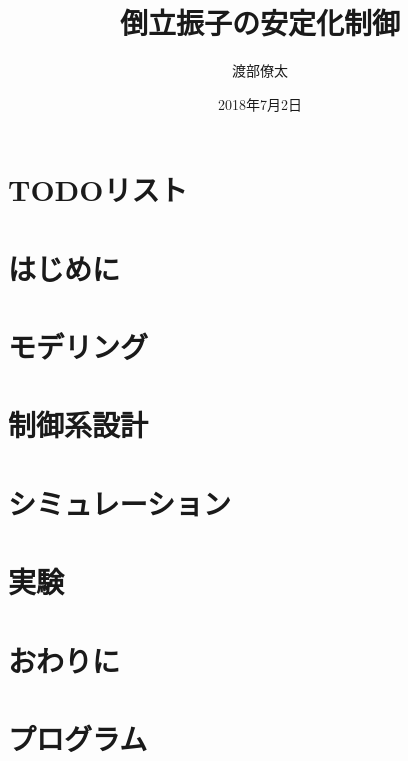 \documentclass[a4j , 11pt , twoside]{jbook}
\begin{document}
\title{倒立振子の安定化制御}
\author{渡部僚太}
\date{2018年7月2日}
\maketitle
\tableofcontents %
\listoffigures %
\listoftables %
\cleardoublepage %
\chapter{TODOリスト}
	
\chapter{はじめに}
	
\chapter{モデリング}
	
\chapter{制御系設計}  
	 
\chapter{シミュレーション}
	
\chapter{実験}
	
\chapter{おわりに}
	



\appendix
\chapter{プログラム}
	
\end{document}
